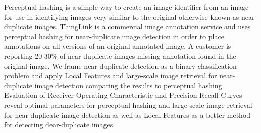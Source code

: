 \documentclass[english,12pt,a4paper,pdftex,elec,utf8, table]{aaltothesis}
\begin{document}


\makecoverpage



\begin{abstractpage}[english]
  Perceptual hashing is a simple way to create an image identifier from an image for use in identifying images very similar to the original otherwise known as near-duplicate images. ThingLink is a commercial image annotation service and uses perceptual hashing for near-duplicate image detection in order to place annotations on all versions of an original annotated image. A customer is reporting 20-30\% of near-duplicate images missing annotation found in the original image. We frame near-duplicate detection as a binary classification problem and apply Local Features and large-scale image retrieval for near-duplicate image detection comparing the results to perceptual hashing. Evaluation of Receiver Operating Characteristic and Precision Recall Curves reveal optimal parameters for perceptual hashing and large-scale image retrieval for near-duplicate image detection as well as Local Features as a better method for detecting dear-duplicate images.
\end{abstractpage}

\newpage
%
\end{document}
